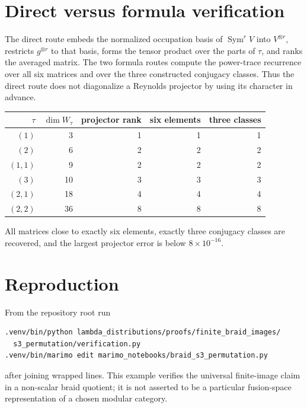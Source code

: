 \documentclass[11pt]{article}
\begin{document}
\section{Direct versus formula verification}
The direct route embeds the normalized occupation basis of
$\operatorname{Sym}^rV$ into $V^{\otimes r}$, restricts $g^{\otimes r}$
to that basis, forms the tensor product over the parts of $\tau$, and ranks
the averaged matrix.  The two formula routes compute the power-trace
recurrence over all six matrices and over the three constructed conjugacy
classes.  Thus the direct route does not diagonalize a Reynolds projector by
using its character in advance.

\begin{center}
\begin{tabular}{@{}rrrrr@{}}\toprule
$\tau$&$\dim W_\tau$&projector rank&six elements&three classes\\\midrule
$(1)$&3&1&1&1\\
$(2)$&6&2&2&2\\
$(1,1)$&9&2&2&2\\
$(3)$&10&3&3&3\\
$(2,1)$&18&4&4&4\\
$(2,2)$&36&8&8&8\\\bottomrule
\end{tabular}
\end{center}
All matrices close to exactly six elements, exactly three conjugacy classes
are recovered, and the largest projector error is below $8\times10^{-16}$.

\section{Reproduction}
From the repository root run
\begin{verbatim}
.venv/bin/python lambda_distributions/proofs/finite_braid_images/
  s3_permutation/verification.py
.venv/bin/marimo edit marimo_notebooks/braid_s3_permutation.py
\end{verbatim}
after joining wrapped lines.  This example verifies the universal finite-image
claim in a non-scalar braid quotient; it is not asserted to be a particular
fusion-space representation of a chosen modular category.
\end{document}
